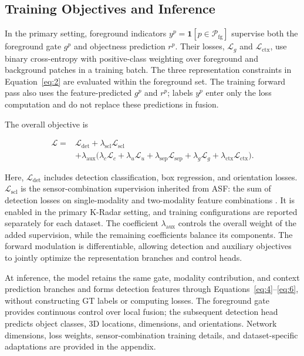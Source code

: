 \subsection{Training Objectives and Inference}
\label{subsec:34}

In the primary setting, foreground indicators \(y^p=\mathbf{1}[p\in\mathcal P_{\mathrm{fg}}]\) supervise both the foreground gate \(g^p\) and objectness prediction \(r^p\). Their losses, \(\mathcal L_g\) and \(\mathcal L_{\mathrm{ctx}}\), use binary cross-entropy with positive-class weighting over foreground and background patches in a training batch. The three representation constraints in Equation~\eqref{eq:2} are evaluated within the foreground set. The training forward pass also uses the feature-predicted \(g^p\) and \(r^p\); labels \(y^p\) enter only the loss computation and do not replace these predictions in fusion.

The overall objective is

\begin{equation}
\begin{aligned}
\mathcal L={}&\mathcal L_{\mathrm{det}}+\lambda_{\mathrm{scl}}\mathcal L_{\mathrm{scl}}\\
&+\lambda_{\mathrm{aux}}\bigl(
\lambda_c\mathcal L_c+
\lambda_u\mathcal L_u+
\lambda_{\mathrm{sep}}\mathcal L_{\mathrm{sep}}+
\lambda_g\mathcal L_g+
\lambda_{\mathrm{ctx}}\mathcal L_{\mathrm{ctx}}\bigr).
\end{aligned}
\label{eq:7}
\end{equation}

Here, \(\mathcal L_{\mathrm{det}}\) includes detection classification, box regression, and orientation losses. \(\mathcal L_{\mathrm{scl}}\) is the sensor-combination supervision inherited from ASF: the sum of detection losses on single-modality and two-modality feature combinations \citep{paek2025asf}. It is enabled in the primary K-Radar setting, and training configurations are reported separately for each dataset. The coefficient \(\lambda_{\mathrm{aux}}\) controls the overall weight of the added supervision, while the remaining coefficients balance its components. The forward modulation is differentiable, allowing detection and auxiliary objectives to jointly optimize the representation branches and control heads.

At inference, the model retains the same gate, modality contribution, and context prediction branches and forms detection features through Equations~\eqref{eq:4}--\eqref{eq:6}, without constructing GT labels or computing losses. The foreground gate provides continuous control over local fusion; the subsequent detection head predicts object classes, 3D locations, dimensions, and orientations. Network dimensions, loss weights, sensor-combination training details, and dataset-specific adaptations are provided in the appendix.


